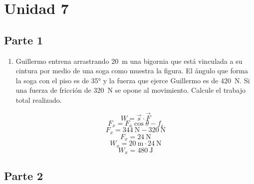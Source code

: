 \documentclass[Física - Práctica.root.tex]{subfiles}
\begin{document}
\section{Unidad 7}
\subsection{Parte 1}
\begin{enumerate}
  \item
        \begin{multicols}{2}
          Guillermo entrena arrastrando \SI{20}{\meter} una bigornia que
          está vinculada a su cintura por medio de una soga como
          muestra la figura. El ángulo que forma la soga con el piso es
          de \ang{35} y la fuerza que ejerce Guillermo es de \SI{420}{\newton}. Si una
          fuerza de fricción de \SI{320}{\newton} se opone al movimiento.
          Calcule el trabajo total realizado. \\
          \begin{center}
          \end{center}
        \end{multicols}
        \begin{center}
          \[ W = \vec{s}\cdot\vec{F} \]
          \[ F_x = F_a\cos\theta - f_s \]
          \[ F_x = \SI{344}{\newton} - \SI{320}{\newton} \]
          \[ F_x = \SI{24}{\newton} \]
          \[ W_x = \SI{20}{\meter}\cdot\SI{24}{\newton} \]
          \[ \boxed{W_x = \SI{480}{\joule}} \]
        \end{center}

\end{enumerate}

\subsection{Parte 2}
\begin{enumerate}

\end{enumerate}
\end{document}
